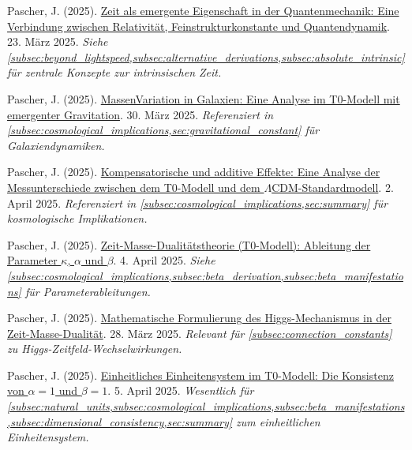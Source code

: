 \documentclass[12pt,a4paper]{article}
\begin{document}
	\begin{thebibliography}{99}
		 Pascher, J. (2025). \href{https://github.com/jpascher/T0-Time-Mass-Duality/tree/main/2/pdf/Deutsch/ZeitEmergentQM.pdf}{Zeit als emergente Eigenschaft in der Quantenmechanik: Eine Verbindung zwischen Relativität, Feinstrukturkonstante und Quantendynamik}. 23. März 2025. \textit{Siehe \cref{subsec:beyond_lightspeed,subsec:alternative_derivations,subsec:absolute_intrinsic} für zentrale Konzepte zur intrinsischen Zeit.}
		
		 Pascher, J. (2025). \href{https://github.com/jpascher/T0-Time-Mass-Duality/tree/main/2/pdf/Deutsch/MassVarGalaxien.pdf}{MassenVariation in Galaxien: Eine Analyse im T0-Modell mit emergenter Gravitation}. 30. März 2025. \textit{Referenziert in \cref{subsec:cosmological_implications,sec:gravitational_constant} für Galaxiendynamiken.}
		
		 Pascher, J. (2025). \href{https://github.com/jpascher/T0-Time-Mass-Duality/tree/main/2/pdf/Deutsch/MessdifferenzenT0Standard.pdf}{Kompensatorische und additive Effekte: Eine Analyse der Messunterschiede zwischen dem T0-Modell und dem \(\Lambda\)CDM-Standardmodell}. 2. April 2025. \textit{Referenziert in \cref{subsec:cosmological_implications,sec:summary} für kosmologische Implikationen.}
		
		 Pascher, J. (2025). \href{https://github.com/jpascher/T0-Time-Mass-Duality/tree/main/2/pdf/Deutsch/ZeitMasseT0Params.pdf}{Zeit-Masse-Dualitätstheorie (T0-Modell): Ableitung der Parameter \(\kappa\), \(\alpha\) und \(\beta\)}. 4. April 2025. \textit{Siehe \cref{subsec:cosmological_implications,subsec:beta_derivation,subsec:beta_manifestations} für Parameterableitungen.}
		
		 Pascher, J. (2025). \href{https://github.com/jpascher/T0-Time-Mass-Duality/tree/main/2/pdf/Deutsch/MathHiggsZeitMasse.pdf}{Mathematische Formulierung des Higgs-Mechanismus in der Zeit-Masse-Dualität}. 28. März 2025. \textit{Relevant für \cref{subsec:connection_constants} zu Higgs-Zeitfeld-Wechselwirkungen.}
		
		 Pascher, J. (2025). \href{https://github.com/jpascher/T0-Time-Mass-Duality/tree/main/2/pdf/Deutsch/Alpha1Beta1Konsistenz.pdf}{Einheitliches Einheitensystem im T0-Modell: Die Konsistenz von \(\alpha = 1\) und \(\beta = 1\)}. 5. April 2025. \textit{Wesentlich für \cref{subsec:natural_units,subsec:cosmological_implications,subsec:beta_manifestations,subsec:dimensional_consistency,sec:summary} zum einheitlichen Einheitensystem.}
		

\end{thebibliography}
\end{document}
